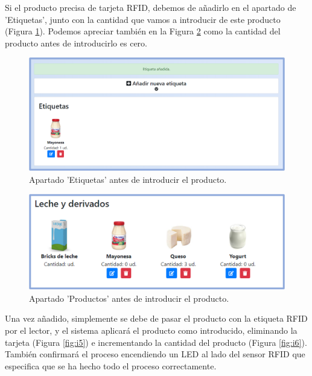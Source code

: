 \newpage
Si el producto precisa de tarjeta RFID, debemos de añadirlo en el apartado de 'Etiquetas', junto con la cantidad que vamos a introducir de este producto (Figura \ref{fig:i4}). Podemos apreciar también en la Figura \ref{fig:i3} como la cantidad del producto antes de introducirlo es cero.

\begin{figure}[h] 
    \centering
    \includegraphics[width=.90\textwidth]{capitulos/capitulo10/introducir/4.png}
    \caption{Apartado 'Etiquetas' antes de introducir el producto.}
    \label{fig:i4}
\end{figure}

\begin{figure}[h] 
    \centering
    \includegraphics[width=.80\textwidth]{capitulos/capitulo10/introducir/3.png}
    \caption{Apartado 'Productos' antes de introducir el producto.}
    \label{fig:i3}
\end{figure}

\newpage
Una vez añadido, simplemente se debe de pasar el producto con la etiqueta RFID por el lector, y el sistema aplicará el producto como introducido, eliminando la tarjeta (Figura \ref{fig:i5}) e incrementando la cantidad del producto (Figura \ref{fig:i6}). También confirmará el proceso encendiendo un LED al lado del sensor RFID que especifica que se ha hecho todo el proceso correctamente.

